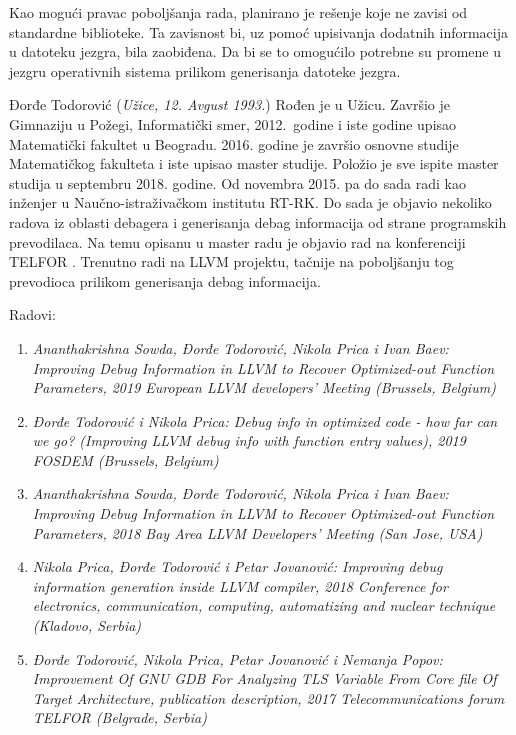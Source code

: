 \documentclass[12pt,oneside]{memoir}
\begin{document}
Kao mogući pravac poboljšanja rada, planirano je rešenje koje ne zavisi od standardne biblioteke. Ta zavisnost bi, uz pomoć upisivanja dodatnih informacija u datoteku jezgra, bila zaobiđena. Da bi se to omogućilo potrebne su promene u jezgru operativnih sistema prilikom generisanja datoteke jezgra.

\literatura

\backmatter

\begin{biografija}
Đorđe Todorović (\emph{Užice, 12. Avgust 1993.}) Rođen je u Užicu. Završio je Gimnaziju u Požegi, Informatički smer, 2012.~godine i iste godine upisao Matematički fakultet u Beogradu. 2016. godine je završio osnovne studije Matematičkog fakulteta i iste upisao master studije. Položio je sve ispite master studija u septembru 2018. godine. Od novembra 2015. pa do sada radi kao inženjer u Naučno-istraživačkom institutu RT-RK. Do sada je objavio nekoliko radova iz oblasti debagera i generisanja debag informacija od strane programskih prevodilaca. Na temu opisanu u master radu je objavio rad na konferenciji TELFOR \cite{TELFOR}. Trenutno radi na LLVM projektu, tačnije na poboljšanju tog prevodioca prilikom generisanja debag informacija.

Radovi:
\begin{enumerate}
	\item \emph{Ananthakrishna Sowda, Đorđe Todorović, Nikola Prica i Ivan Baev: Improving Debug Information in LLVM to Recover Optimized-out Function Parameters, 2019 European LLVM developers' Meeting (Brussels, Belgium)}
	\item \emph{Đorđe Todorović i Nikola Prica: Debug info in optimized code - how far can we go? (Improving LLVM debug info with function entry values), 2019 FOSDEM (Brussels, Belgium)}
	\item \emph{Ananthakrishna Sowda, Đorđe Todorović, Nikola Prica i Ivan Baev: Improving Debug Information in LLVM to Recover Optimized-out Function Parameters, 2018 Bay Area LLVM Developers' Meeting (San Jose, USA)}
	\item \emph{Nikola Prica, Đorđe Todorović i Petar Jovanović: Improving debug information generation inside LLVM compiler, 2018 Conference for electronics, communication, computing, automatizing and nuclear technique (Kladovo, Serbia)}
	\item \emph{Đorđe Todorović, Nikola Prica, Petar Jovanović i Nemanja Popov: Improvement Of GNU GDB For Analyzing TLS Variable From Core file Of Target Architecture, publication description, 2017 Telecommunications forum TELFOR (Belgrade, Serbia)}
\end{enumerate}

\end{biografija}
\end{document}
